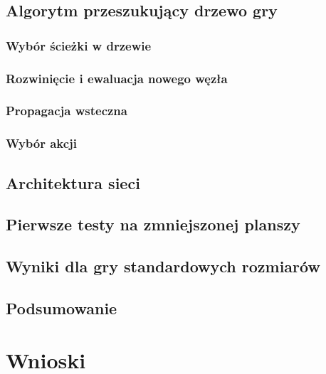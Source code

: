 \documentclass[licencjacka]{pracamgr}
\begin{document}
\section{Algorytm przeszukujący drzewo gry}

\subsection{Wybór ścieżki w drzewie}

\subsection{Rozwinięcie i ewaluacja nowego węzła}

\subsection{Propagacja wsteczna}

\subsection{Wybór akcji}

\section{Architektura sieci}

\section{Pierwsze testy na zmniejszonej planszy}

\section{Wyniki dla gry standardowych rozmiarów}

\section{Podsumowanie}

\chapter{Wnioski}

\begin{thebibliography}{99}

\end{thebibliography}
\end{document}
